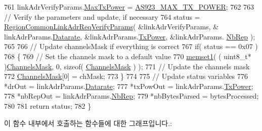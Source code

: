\begin{DoxyCode}
761     linkAdrVerifyParams.\mbox{\hyperlink{structs_region_common_link_adr_req_verify_params_a118829b26fb7d913d4202d5d06356a95}{MaxTxPower}} = \mbox{\hyperlink{group___r_e_g_i_o_n_a_s923_ga572944e6a8933722a954e4cee98fa0ee}{AS923\_MAX\_TX\_POWER}};
762 
763     \textcolor{comment}{// Verify the parameters and update, if necessary}
764     status = \mbox{\hyperlink{group___r_e_g_i_o_n_c_o_m_m_o_n_ga2c87f98f09793dc7fa63a9801feeed73}{RegionCommonLinkAdrReqVerifyParams}}( &linkAdrVerifyParams, &
      linkAdrParams.\mbox{\hyperlink{structs_region_common_link_adr_params_ae2f6080f3aa0e9485c55513ca56bb24d}{Datarate}}, &linkAdrParams.\mbox{\hyperlink{structs_region_common_link_adr_params_a037b4f849fa8ed4aa1d3c58aef2b28ec}{TxPower}}, &linkAdrParams.
      \mbox{\hyperlink{structs_region_common_link_adr_params_a3b99538671d86dbfe2f6754ce6f9577a}{NbRep}} );
765 
766     \textcolor{comment}{// Update channelsMask if everything is correct}
767     \textcolor{keywordflow}{if}( status == 0x07 )
768     \{
769         \textcolor{comment}{// Set the channels mask to a default value}
770         \mbox{\hyperlink{utilities_8c_a272ed6d691263d9762c98ed720b1fa3a}{memset1}}( ( uint8\_t* )\mbox{\hyperlink{_region_a_s923_8c_a2188957b5ca6af8092154d7ccbfa5757}{ChannelsMask}}, 0, \textcolor{keyword}{sizeof}( 
      \mbox{\hyperlink{_region_a_s923_8c_a2188957b5ca6af8092154d7ccbfa5757}{ChannelsMask}} ) );
771         \textcolor{comment}{// Update the channels mask}
772         \mbox{\hyperlink{_region_a_s923_8c_a2188957b5ca6af8092154d7ccbfa5757}{ChannelsMask}}[0] = chMask;
773     \}
774 
775     \textcolor{comment}{// Update status variables}
776     *drOut = linkAdrParams.\mbox{\hyperlink{structs_region_common_link_adr_params_ae2f6080f3aa0e9485c55513ca56bb24d}{Datarate}};
777     *txPowOut = linkAdrParams.\mbox{\hyperlink{structs_region_common_link_adr_params_a037b4f849fa8ed4aa1d3c58aef2b28ec}{TxPower}};
778     *nbRepOut = linkAdrParams.\mbox{\hyperlink{structs_region_common_link_adr_params_a3b99538671d86dbfe2f6754ce6f9577a}{NbRep}};
779     *nbBytesParsed = bytesProcessed;
780 
781     \textcolor{keywordflow}{return} status;
782 \}
\end{DoxyCode}
이 함수 내부에서 호출하는 함수들에 대한 그래프입니다.\+:
\mbox{\label{group___r_e_g_i_o_n_a_s923_gaad10b4ed09a71cdff0e385729e4dc345}} 
